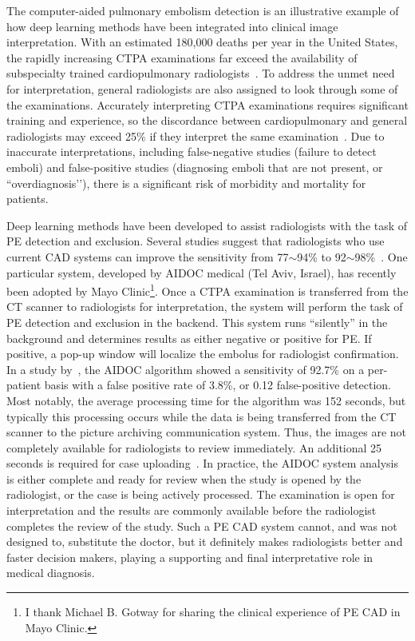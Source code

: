 The computer-aided pulmonary embolism detection is an illustrative example of how deep learning methods have been integrated into clinical image interpretation. With an estimated 180,000 deaths per year in the United States, the rapidly increasing CTPA examinations far exceed the availability of subspecialty trained cardiopulmonary radiologists~\citep{horlander2003pulmonary}. To address the unmet need for interpretation, general radiologists are also assigned to look through some of the examinations.
Accurately interpreting CTPA examinations requires significant training and experience, so the discordance between cardiopulmonary and general radiologists may exceed 25\% if they interpret the same examination~\citep{hutchinson2015overdiagnosis}. Due to inaccurate interpretations, including false-negative studies (failure to detect emboli) and false-positive studies (diagnosing emboli that are not present, or ``overdiagnosis’’), there is a significant risk of morbidity and mortality for patients. 

Deep learning methods have been developed to assist radiologists with the task of PE detection and exclusion. Several studies suggest that radiologists who use current CAD systems can improve the sensitivity from 77$\sim$94\% to 92$\sim$98\%~\citep{das2008computer,wittenberg2011impact,blackmon2011computer,wittenberg2013computed}. 
One particular system, developed by AIDOC medical (Tel Aviv, Israel), has recently been adopted by Mayo Clinic\footnote{I thank Michael B. Gotway for sharing the clinical experience of PE CAD in Mayo Clinic.}. Once a CTPA examination is transferred from the CT scanner to radiologists for interpretation, the system will perform the task of PE detection and exclusion in the backend. This system runs ``silently'' in the background and determines results as either negative or positive for PE. If positive, a pop-up window will localize the embolus for radiologist confirmation. In a study by~\citet{weikert2020automated}, the AIDOC algorithm showed a sensitivity of 92.7\% on a per-patient basis with a false positive rate of 3.8\%, or 0.12 false-positive detection. Most notably, the average processing time for the algorithm was 152 seconds, but typically this processing occurs while the data is being transferred from the CT scanner to the picture archiving communication system. Thus, the images are not completely available for radiologists to review immediately. An additional 25 seconds is required for case uploading~\citep{weikert2020automated}. In practice, the AIDOC system analysis is either complete and ready for review when the study is opened by the radiologist, or the case is being actively processed. The examination is open for interpretation and the results are commonly available before the radiologist completes the review of the study. 
Such a PE CAD system cannot, and was not designed to, substitute the doctor, but it definitely makes radiologists better and faster decision makers, playing a supporting and final interpretative role in medical diagnosis.


